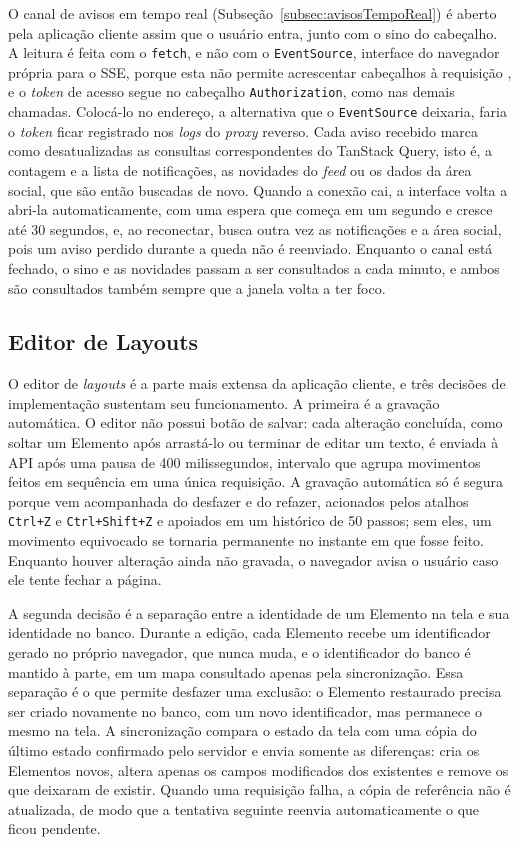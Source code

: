 O canal de avisos em tempo real (Subseção~\ref{subsec:avisosTempoReal}) é aberto pela aplicação cliente assim que o usuário entra, junto com o sino do
cabeçalho. A leitura é feita com o \texttt{fetch}, e não com o \texttt{EventSource}, interface do navegador própria para o SSE, porque esta não permite
acrescentar cabeçalhos à requisição \cite{whatwg2026sse}, e o \textit{token} de acesso segue no cabeçalho \texttt{Authorization}, como nas demais chamadas.
Colocá-lo no endereço, a alternativa que o \texttt{EventSource} deixaria, faria o \textit{token} ficar registrado nos \textit{logs} do \textit{proxy}
reverso. Cada aviso recebido marca como desatualizadas as consultas correspondentes do TanStack Query, isto é, a contagem e a lista de notificações, as
novidades do \textit{feed} ou os dados da área social, que são então buscadas de novo. Quando a conexão cai, a interface volta a abri-la automaticamente,
com uma espera que começa em um segundo e cresce até 30 segundos, e, ao reconectar, busca outra vez as notificações e a área social, pois um aviso perdido
durante a queda não é reenviado. Enquanto o canal está fechado, o sino e as novidades passam a ser consultados a cada minuto, e ambos são consultados
também sempre que a janela volta a ter foco.

\subsection{Editor de Layouts}

O editor de \textit{layouts} é a parte mais extensa da aplicação cliente, e três decisões de implementação sustentam seu funcionamento. A primeira é a gravação automática. O editor não possui botão de salvar: cada alteração concluída, como soltar um Elemento após arrastá-lo ou terminar de editar um texto, é enviada à API após uma pausa de 400 milissegundos, intervalo que agrupa movimentos feitos em sequência em uma única requisição. A gravação automática só é segura porque vem acompanhada do desfazer e do refazer, acionados pelos atalhos \texttt{Ctrl+Z} e \texttt{Ctrl+Shift+Z} e apoiados em um histórico de 50 passos; sem eles, um movimento equivocado se tornaria permanente no instante em que fosse feito. Enquanto houver alteração ainda não gravada, o navegador avisa o usuário caso ele tente fechar a página.

A segunda decisão é a separação entre a identidade de um Elemento na tela e sua identidade no banco. Durante a edição, cada Elemento recebe um identificador gerado no próprio navegador, que nunca muda, e o identificador do banco é mantido à parte, em um mapa consultado apenas pela sincronização. Essa separação é o que permite desfazer uma exclusão: o Elemento restaurado precisa ser criado novamente no banco, com um novo identificador, mas permanece o mesmo na tela. A sincronização compara o estado da tela com uma cópia do último estado confirmado pelo servidor e envia somente as diferenças: cria os Elementos novos, altera apenas os campos modificados dos existentes e remove os que deixaram de existir. Quando uma requisição falha, a cópia de referência não é atualizada, de modo que a tentativa seguinte reenvia automaticamente o que ficou pendente.

